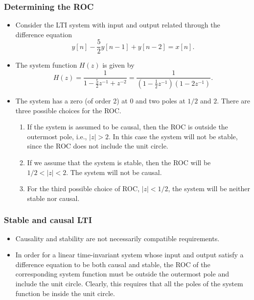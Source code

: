 \begin{frame}
\frametitle{Determining the ROC}
\begin{itemize}
\item Consider the LTI system with input and output related through the difference equation
$$
y[n]-\frac{5}{2}y[n-1]+y[n-2]=x[n].
$$
\item The system function $H(z)$ is given by
$$
H(z)=\frac{1}{1-\frac{5}{2}z^{-1}+z^{-2}}=\frac{1}{(1-\frac{1}{2}z^{-1})(1-2z^{-1})}.
$$
\item The system has a zero (of order 2) at $0$ and two poles at $1/2$ and $2$. There are three possible choices for the ROC.
\begin{enumerate}
\item  If the system is assumed to be causal, then the ROC is outside the outermost pole, i.e., $|z|>2$. In this case the system will not be stable, since the ROC does not include the unit circle.
\item If we assume that the system is stable, then the ROC will be $1/2<|z| <2$. The system will not be causal.
\item For the third possible choice of ROC, $|z|< 1/2$, the system will be neither stable nor causal.
\end{enumerate}
\end{itemize}
\end{frame}

\begin{frame}
\frametitle{Stable and causal LTI}
\begin{itemize}
\item Causality and stability are not necessarily compatible requirements.
\item In order for a linear time-invariant system whose input and output satisfy a difference equation to be both causal and stable, the ROC of the corresponding system function \alert{must be outside the outermost pole}  and \alert{include the unit circle}. Clearly, this requires that all the poles of the system function be inside the unit circle.
\end{itemize}
\end{frame}

